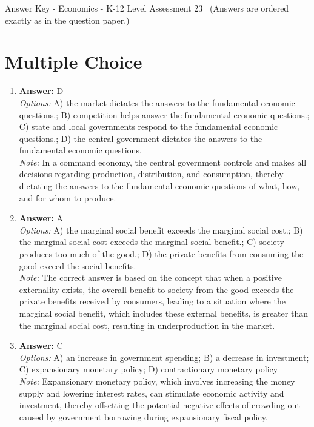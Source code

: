 \documentclass[12pt]{article}
\begin{document}
\begin{center}
Answer Key - Economics - K-12 Level Assessment 23 \
\small (Answers are ordered exactly as in the question paper.)
\end{center}

\section*{Multiple Choice}
\begin{enumerate}[label=\arabic*.]
\item \textbf{Answer:} D
\\ \textit{Options:} A) the market dictates the answers to the fundamental economic questions.; B) competition helps answer the fundamental economic questions.; C) state and local governments respond to the fundamental economic questions.; D) the central government dictates the answers to the fundamental economic questions.
\\ \textit{Note:} In a command economy, the central government controls and makes all decisions regarding production, distribution, and consumption, thereby dictating the answers to the fundamental economic questions of what, how, and for whom to produce.
\item \textbf{Answer:} A
\\ \textit{Options:} A) the marginal social benefit exceeds the marginal social cost.; B) the marginal social cost exceeds the marginal social benefit.; C) society produces too much of the good.; D) the private benefits from consuming the good exceed the social benefits.
\\ \textit{Note:} The correct answer is based on the concept that when a positive externality exists, the overall benefit to society from the good exceeds the private benefits received by consumers, leading to a situation where the marginal social benefit, which includes these external benefits, is greater than the marginal social cost, resulting in underproduction in the market.
\item \textbf{Answer:} C
\\ \textit{Options:} A) an increase in government spending; B) a decrease in investment; C) expansionary monetary policy; D) contractionary monetary policy
\\ \textit{Note:} Expansionary monetary policy, which involves increasing the money supply and lowering interest rates, can stimulate economic activity and investment, thereby offsetting the potential negative effects of crowding out caused by government borrowing during expansionary fiscal policy.

\end{enumerate}
\end{document}
